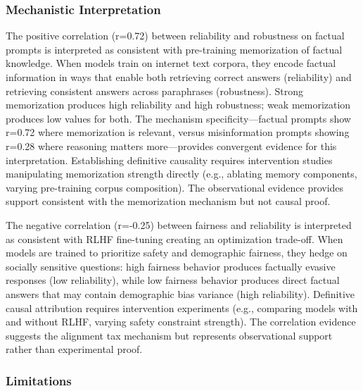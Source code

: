 
\subsubsection{Mechanistic Interpretation}

The positive correlation (r=0.72) between reliability and robustness on factual prompts is interpreted as consistent with pre-training memorization of factual knowledge. When models train on internet text corpora, they encode factual information in ways that enable both retrieving correct answers (reliability) and retrieving consistent answers across paraphrases (robustness). Strong memorization produces high reliability and high robustness; weak memorization produces low values for both. The mechanism specificity---factual prompts show r=0.72 where memorization is relevant, versus misinformation prompts showing r=0.28 where reasoning matters more---provides convergent evidence for this interpretation. Establishing definitive causality requires intervention studies manipulating memorization strength directly (e.g., ablating memory components, varying pre-training corpus composition). The observational evidence provides support consistent with the memorization mechanism but not causal proof.

The negative correlation (r=-0.25) between fairness and reliability is interpreted as consistent with RLHF fine-tuning creating an optimization trade-off. When models are trained to prioritize safety and demographic fairness, they hedge on socially sensitive questions: high fairness behavior produces factually evasive responses (low reliability), while low fairness behavior produces direct factual answers that may contain demographic bias variance (high reliability). Definitive causal attribution requires intervention experiments (e.g., comparing models with and without RLHF, varying safety constraint strength). The correlation evidence suggests the alignment tax mechanism but represents observational support rather than experimental proof.

\subsubsection{Limitations}

